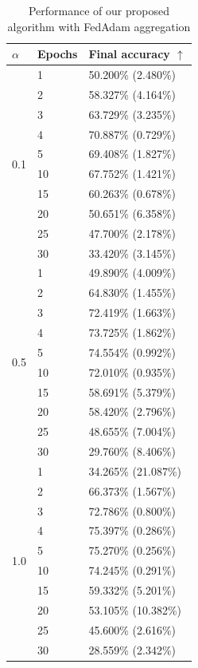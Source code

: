 \documentclass[conference,compsoc]{IEEEtran}
\begin{document}
\begin{table}[ht]
\centering
\caption{Performance of our proposed algorithm with FedAdam aggregation}
    \centering
    \begin{tabular}{lll}
    \hline
    $\alpha$ & \textbf{Epochs} & \textbf{Final accuracy $\uparrow$} \\
    \hline
    \multirow{10}{*}{0.1} & 1 & 50.200\% (2.480\%) \\
    & 2 & 58.327\% (4.164\%) \\
    & 3 & 63.729\% (3.235\%) \\
    & 4 & 70.887\% (0.729\%) \\
    & 5 & 69.408\% (1.827\%) \\
    & 10 & 67.752\% (1.421\%) \\
    & 15 & 60.263\% (0.678\%) \\
    & 20 & 50.651\% (6.358\%) \\
    & 25 & 47.700\% (2.178\%) \\
    & 30 & 33.420\% (3.145\%) \\
    \hline
    \multirow{10}{*}{0.5} & 1 & 49.890\% (4.009\%) \\
    & 2 & 64.830\% (1.455\%) \\
    & 3 & 72.419\% (1.663\%) \\
    & 4 & 73.725\% (1.862\%) \\
    & 5 & 74.554\% (0.992\%) \\
    & 10 & 72.010\% (0.935\%) \\
    & 15 & 58.691\% (5.379\%) \\
    & 20 & 58.420\% (2.796\%) \\
    & 25 & 48.655\% (7.004\%) \\
    & 30 & 29.760\% (8.406\%) \\
    \hline
    \multirow{10}{*}{1.0} & 1 & 34.265\% (21.087\%) \\
    & 2 & 66.373\% (1.567\%) \\
    & 3 & 72.786\% (0.800\%) \\
    & 4 & 75.397\% (0.286\%) \\
    & 5 & 75.270\% (0.256\%) \\
    & 10 & 74.245\% (0.291\%) \\
    & 15 & 59.332\% (5.201\%) \\
    & 20 & 53.105\% (10.382\%) \\
    & 25 & 45.600\% (2.616\%) \\
    & 30 & 28.559\% (2.342\%) \\

\end{tabular}
\end{table}
\end{document}
